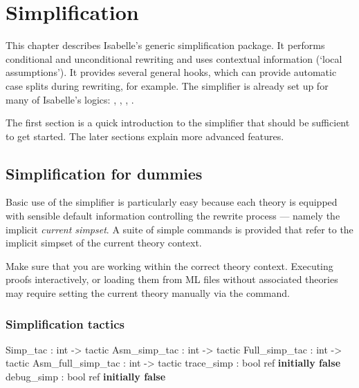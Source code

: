 \chapter{Simplification}
\label{chap:simplification}

This chapter describes Isabelle's generic simplification package.  It
performs conditional and unconditional rewriting and uses contextual
information (`local assumptions').  It provides several general hooks,
which can provide automatic case splits during rewriting, for example.
The simplifier is already set up for many of Isabelle's logics: \FOL,
\ZF, \HOL, \HOLCF.

The first section is a quick introduction to the simplifier that
should be sufficient to get started.  The later sections explain more
advanced features.


\section{Simplification for dummies}
\label{sec:simp-for-dummies}

Basic use of the simplifier is particularly easy because each theory
is equipped with sensible default information controlling the rewrite
process --- namely the implicit {\em current
  simpset}.  A suite of simple commands is
provided that refer to the implicit simpset of the current theory
context.

\begin{warn}
  Make sure that you are working within the correct theory context.
  Executing proofs interactively, or loading them from ML files
  without associated theories may require setting the current theory
  manually via the  command.
\end{warn}

\subsection{Simplification tactics} \label{sec:simp-for-dummies-tacs}
\begin{ttbox}
Simp_tac          : int -> tactic
Asm_simp_tac      : int -> tactic
Full_simp_tac     : int -> tactic
Asm_full_simp_tac : int -> tactic
trace_simp        : bool ref \hfill{\bf initially false}
debug_simp        : bool ref \hfill{\bf initially false}
\end{ttbox}

